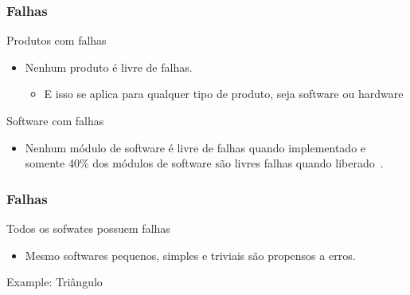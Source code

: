 \begin{frame}[parent={cmap:software-testing-foundations}, hasprev=false, hasnext=true]
\frametitle{Falhas}
\label{concept:falha}

\begin{block:fact}{Produtos com falhas}
\begin{itemize}
    \item Nenhum produto é livre de falhas.
    \begin{itemize}
		\item E isso se aplica para qualquer tipo de produto, seja software ou hardware
    \end{itemize}
\end{itemize}

\hfill
{}
\end{block:fact}


\begin{block:fact}{Software com falhas}
\begin{itemize}
	\item Nenhum módulo de software é livre de falhas quando implementado e somente 40\% dos módulos de software são livres falhas quando liberado~\cite{shull-etal:2002}.
\end{itemize}
\hfill
{}
\end{block:fact}
\end{frame}


\begin{frame}[hasprev=true, hasnext=true]
\frametitle{Falhas}
\label{concept:detecção-de-falha}

\begin{block:fact}{Todos os sofwates possuem falhas}
\begin{itemize}
	\item Mesmo softwares pequenos, simples e triviais são propensos a erros.
\end{itemize}
\end{block:fact}

\begin{block}{Example: Triângulo}
\centering
{}
\end{block}
\end{frame}


